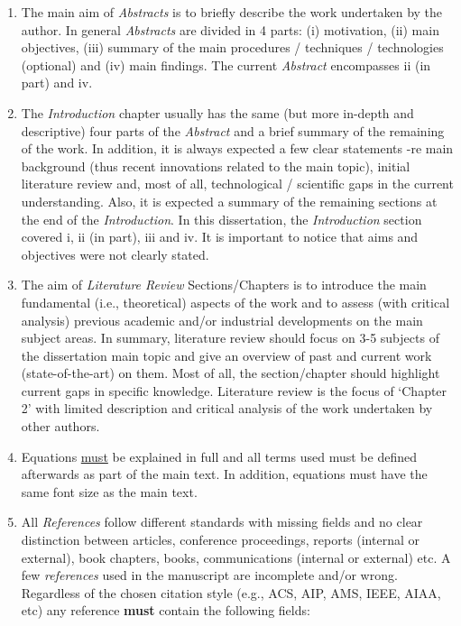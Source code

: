 \documentclass[14pt,twoside]{report}
\begin{document}
\begin{enumerate}
\item The main aim of {\it Abstracts} is to briefly describe the work undertaken by the author. In general {\it Abstracts} are divided in 4 parts: (i) motivation, (ii) main objectives, (iii) summary of the main procedures / techniques / technologies (optional) and (iv) main findings. The current {\it Abstract} encompasses ii (in part) and iv.
%
\item The {\it Introduction} chapter usually has the same (but more in-depth and descriptive) four parts of the {\it Abstract} and a brief summary of the remaining of the work. In addition, it is always expected a few clear statements -re main background (thus recent innovations related to the main topic), initial literature review and, most of all, technological / scientific gaps in the current understanding. Also, it is expected a summary of the remaining sections at the end of the {\it Introduction}. In this dissertation, the {\it Introduction} section covered i, ii (in part), iii and iv. It is important to notice that aims and objectives were not clearly stated. 
%
\item The aim of {\it Literature Review} Sections/Chapters is to introduce the main fundamental (i.e., theoretical) aspects of the work and to assess (with critical analysis) previous academic and/or industrial developments on the main subject areas. In summary, literature review should focus on 3-5 subjects of the dissertation main topic and give an overview of past and current work (state-of-the-art) on them. Most of all, the section/chapter should highlight current gaps in specific knowledge. Literature review is the focus of `Chapter 2' with limited description and critical analysis of the work undertaken by other authors. 
%
\item Equations \underline{must} be explained in full and all terms used must be defined afterwards as part of the main text. In addition, equations must have the same font size as the main text.
%
\item All {\it References} follow different standards with missing fields and no clear distinction between articles, conference proceedings, reports (internal or external), book chapters, books, communications (internal or external) etc.  A few {\it references} used in the manuscript are incomplete and/or wrong. Regardless of the chosen citation style (e.g., ACS, AIP, AMS, IEEE, AIAA, etc) any reference {\bf must} contain the following fields: 
\begin{enumerate}

\end{enumerate}
\end{enumerate}
\end{document}
